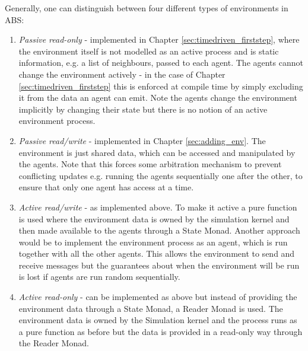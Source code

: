 Generally, one can distinguish between four different types of environments in ABS:

\begin{enumerate}
	\item \textit{Passive read-only} - implemented in Chapter \ref{sec:timedriven_firststep}, where the environment itself is not modelled as an active process and is static information, e.g. a list of neighbours, passed to each agent. The agents cannot change the environment actively - in the case of Chapter \ref{sec:timedriven_firststep} this is enforced at compile time by simply excluding it from the data an agent can emit. Note the agents change the environment implicitly by changing their state but there is no notion of an active environment process.
	
	\item \textit{Passive read/write} - implemented in Chapter \ref{sec:adding_env}. The environment is just shared data, which can be accessed and manipulated by the agents. Note that this forces some arbitration mechanism to prevent conflicting updates e.g. running the agents sequentially one after the other, to ensure that only one agent has access at a time.
	
	\item \textit{Active read/write} - as implemented above. To make it active a pure function is used where the environment data is owned by the simulation kernel and then made available to the agents through a State Monad. Another approach would be to implement the environment process as an agent, which is run together with all the other agents. This allows the environment to send and receive messages but the guarantees about when the environment will be run is lost if agents are run random sequentially.
	
	\item \textit{Active read-only} - can be implemented as above but instead of providing the environment data through a State Monad, a Reader Monad is used. The environment data is owned by the Simulation kernel and the process runs as a pure function as before but the data is provided in a read-only way through the Reader Monad.
\end{enumerate}